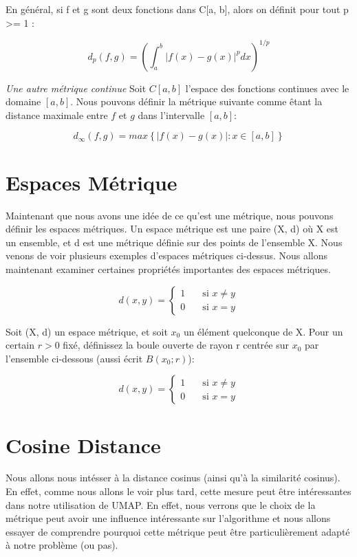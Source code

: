 En général, si f et g sont deux fonctions dans C[a, b], alors on définit pour tout p >= 1 :

$$ d_p(f,g) = (\int_a^b  \lvert f(x) - g(x) \rvert ^p dx)^{1/p}$$

\textit{Une autre métrique continue}
Soit $C[a, b]$ l'espace des fonctions continues avec le domaine $[a, b]$. Nous pouvons définir la métrique suivante comme êtant la distance maximale entre $f$ et $g$ dans l'intervalle $[a, b] $: 

$$ d_\infty(f,g) = max \left\{  \lvert f(x) - g(x) \rvert : x \in [a,b] \right\}$$

    
\section*{Espaces Métrique}
Maintenant que nous avons une idée de ce qu'est une métrique, nous pouvons définir les espaces métriques. Un espace métrique est une paire (X, d) où X est un ensemble, et d est une métrique définie sur des points de l'ensemble X. Nous venons de voir plusieurs exemples d'espaces métriques ci-dessus. Nous allons maintenant examiner certaines propriétés importantes des espaces métriques.

\[ d(x,y) =
  \begin{cases}
    1       & \quad \text{si } x \ne y \\
    0       & \quad \text{si } x = y 
  \end{cases}
\]

Soit (X, d) un espace métrique, et soit $x_0$ un élément quelconque de X. Pour un certain $r > 0$ fixé, définissez la boule ouverte de rayon r centrée sur $x_0$ par l'ensemble ci-dessous (aussi écrit $B(x_0 ; r)$): 

\[ d(x,y) =
  \begin{cases}
    1       & \quad \text{si } x \ne y \\
    0       & \quad \text{si } x = y 
  \end{cases}
\]


\section*{Cosine Distance}
Nous allons nous intésser à la distance cosinus (ainsi  qu'à la similarité cosinus). En effet, comme nous allons le  voir plus tard, cette mesure peut être intéressantes dans notre utilisation de UMAP. En effet, nous verrons que le choix de la métrique peut avoir une influence intéressante sur l'algorithme et nous allons essayer de comprendre pourquoi cette métrique peut être particulièrement adapté à notre problème (ou pas).


